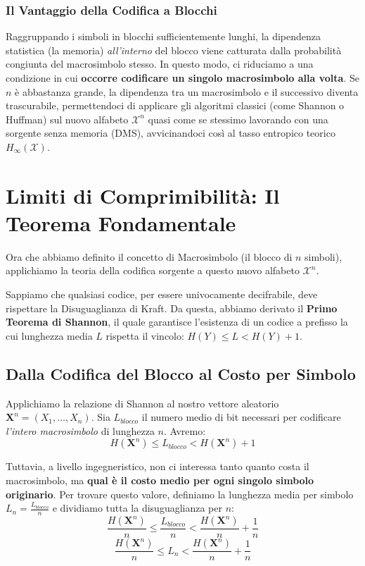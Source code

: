 \subsubsection*{Il Vantaggio della Codifica a Blocchi}
Raggruppando i simboli in blocchi sufficientemente lunghi, la dipendenza statistica (la memoria) \textit{all'interno} del blocco viene catturata dalla probabilità congiunta del macrosimbolo stesso. 
In questo modo, ci riduciamo a una condizione in cui \textbf{occorre codificare un singolo macrosimbolo alla volta}. Se $n$ è abbastanza grande, la dipendenza tra un macrosimbolo e il successivo diventa trascurabile, permettendoci di applicare gli algoritmi classici (come Shannon o Huffman) sul nuovo alfabeto $\mathcal{X}^n$ quasi come se stessimo lavorando con una sorgente senza memoria (DMS), avvicinandoci così al tasso entropico teorico $H_\infty(\mathcal{X})$.

\section{Limiti di Comprimibilità: Il Teorema Fondamentale}

Ora che abbiamo definito il concetto di Macrosimbolo (il blocco di $n$ simboli), applichiamo la teoria della codifica sorgente a questo nuovo alfabeto $\mathcal{X}^n$.

Sappiamo che qualsiasi codice, per essere univocamente decifrabile, deve rispettare la Disuguaglianza di Kraft. Da questa, abbiamo derivato il \textbf{Primo Teorema di Shannon}, il quale garantisce l'esistenza di un codice a prefisso la cui lunghezza media $L$ rispetta il vincolo: $H(Y) \le L < H(Y) + 1$.

\subsection{Dalla Codifica del Blocco al Costo per Simbolo}

Applichiamo la relazione di Shannon al nostro vettore aleatorio $\mathbf{X}^n = (X_1, \dots, X_n)$. 
Sia $L_{blocco}$ il numero medio di bit necessari per codificare \textit{l'intero macrosimbolo} di lunghezza $n$. Avremo:
\begin{equation}
    H(\mathbf{X}^n) \le L_{blocco} < H(\mathbf{X}^n) + 1
\end{equation}

Tuttavia, a livello ingegneristico, non ci interessa tanto quanto costa il macrosimbolo, ma \textbf{qual è il costo medio per ogni singolo simbolo originario}. Per trovare questo valore, definiamo la lunghezza media per simbolo $L_n = \frac{L_{blocco}}{n}$ e dividiamo tutta la disuguaglianza per $n$:
\begin{equation}
    \frac{H(\mathbf{X}^n)}{n} \le \frac{L_{blocco}}{n} < \frac{H(\mathbf{X}^n)}{n} + \frac{1}{n}
\end{equation}
\begin{equation}
    \frac{H(\mathbf{X}^n)}{n} \le L_n < \frac{H(\mathbf{X}^n)}{n} + \frac{1}{n}
\end{equation}

